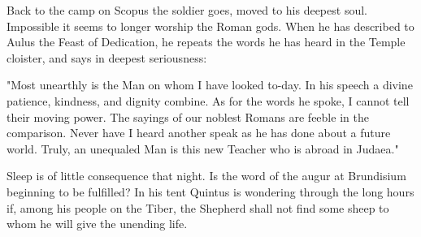 Back to the camp on Scopus the soldier goes, moved to his deepest
soul.  Impossible it seems to longer worship the Roman gods.  When
he has described to Aulus the Feast of Dedication, he repeats the
words he has heard in the Temple cloister, and says in deepest
seriousness:

"Most unearthly is the Man on whom I have looked to-day.  In his
speech a divine patience, kindness, and dignity combine.  As for
the words he spoke, I cannot tell their moving power.  The sayings
of our noblest Romans are feeble in the comparison.  Never have I
heard another speak as he has done about a future world.  Truly, an
unequaled Man is this new Teacher who is abroad in Judaea."

Sleep is of little consequence that night.  Is the word of the
augur at Brundisium beginning to be fulfilled?  In his tent Quintus
is wondering through the long hours if, among his people on the
Tiber, the Shepherd shall not find some sheep to whom he will give
the unending life.
